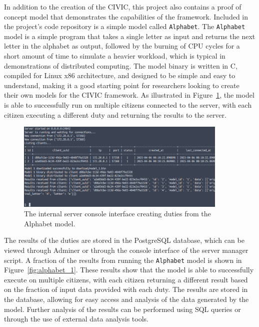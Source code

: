 \documentclass[11pt]{article}
\begin{document}
In addition to the creation of the CIVIC, this project also contains a proof of concept model that demonstrates the capabilities of the framework. Included in the project's code repository is a simple model called \verb|Alphabet|. The \verb|Alphabet| model is a simple program that takes a single letter as input and returns the next letter in the alphabet as output, followed by the burning of CPU cycles for a short amount of time to simulate a heavier workload, which is typical in demonstrations of distributed computing. The model binary is written in C, compiled for Linux x86 architecture, and designed to be simple and easy to understand, making it a good starting point for researchers looking to create their own models for the CIVIC framework. As illustrated in Figure~\ref{fig:internal_server}, the model is able to successfully run on multiple citizens connected to the server, with each citizen executing a different duty and returning the results to the server. 

\begin{figure}[h]
    \centering
    \includegraphics[width=0.9\textwidth]{./figures/internal_server.png}
    \caption{\small The internal server console interface creating duties from the Alphabet model.}\label{fig:internal_server}
\end{figure}

The results of the duties are stored in the PostgreSQL database, which can be viewed through Adminer or through the console interface of the server manager script. A fraction of the results from running the \verb|Alphabet| model is shown in Figure~\ref{fig:alphabet_1}. These results show that the model is able to successfully execute on multiple citizens, with each citizen returning a different result based on the fraction of input data provided with each duty. The results are stored in the database, allowing for easy access and analysis of the data generated by the model. Further analysis of the results can be performed using SQL queries or through the use of external data analysis tools.
\end{document}
